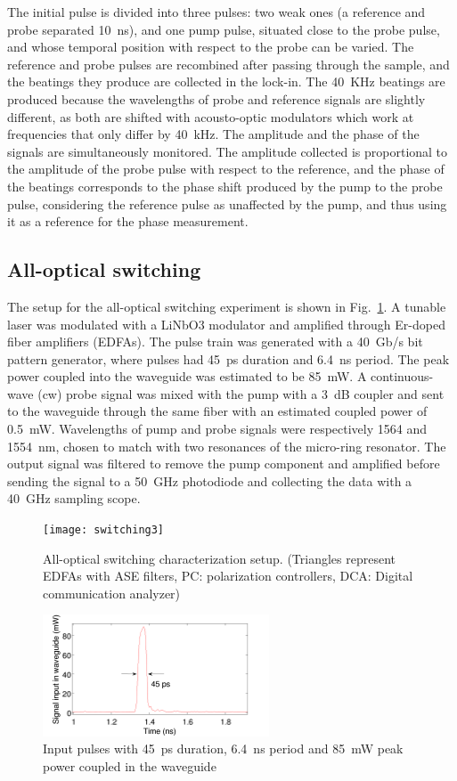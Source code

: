 The initial pulse is divided into three pulses: two weak ones (a reference and probe separated 10~ns), and one pump pulse, situated close to the probe pulse, and whose temporal position with respect to the probe can be varied. The reference and probe pulses are recombined after passing through the sample, and the beatings they produce are collected in the lock-in. The 40~KHz beatings  are produced because the wavelengths of probe and reference signals are slightly different, as both are shifted with acousto-optic modulators which work at frequencies that only differ by 40~kHz. The amplitude and the phase of the signals are simultaneously monitored.
The amplitude collected is proportional to the amplitude of the probe pulse with respect to the reference, and the phase of the beatings corresponds to the phase shift produced by the pump to the probe pulse, considering the reference pulse as unaffected by the pump, and thus using it as a reference for the phase measurement. 


\subsection{All-optical switching}
The setup for the all-optical switching experiment is shown in Fig.~\ref{fig:switchingSetupSwitching}. A tunable laser was modulated with a LiNbO3 modulator and amplified through Er-doped fiber amplifiers (EDFAs). The pulse train was generated with a 40~Gb/s bit pattern generator, where pulses had 45~ps duration and 6.4~ns period. The peak power coupled into the waveguide was estimated to be 85~mW. A continuous-wave (cw) probe signal was mixed with the pump with a 3~dB coupler and sent to the waveguide through the same fiber with an estimated coupled power of 0.5~mW. Wavelengths of pump and probe signals were respectively 1564 and 1554~nm, chosen to match with two resonances of the micro-ring resonator. The output signal was filtered to remove the pump component and amplified before sending the signal to a 50~GHz photodiode and collecting the data with a 40~GHz sampling scope.


\begin{figure}[htb]
    \centering
    \texttt{[image: switching3]}
    \caption{All-optical switching characterization setup. (Triangles represent EDFAs with ASE filters, PC: polarization controllers, DCA: Digital communication analyzer)}
    \label{fig:switchingSetupSwitching}
\end{figure}

\begin{figure}[htb]
    \centering
    \includegraphics[width=0.6\textwidth]{inputPulsesSwitchingBig}
    \caption{Input pulses with 45~ps duration, 6.4~ns period and 85~mW peak power coupled in the waveguide}
    \label{fig:inputPulsesSwitchingBig}
\end{figure}

